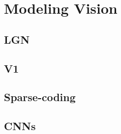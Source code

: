 \documentclass[usletter,twoside,12pt]{book}
\begin{document}
\section{}


\chapter{Modeling Vision}

\section{LGN}

\section{V1}

\section{Sparse-coding}

\section{CNNs}
\end{document}
